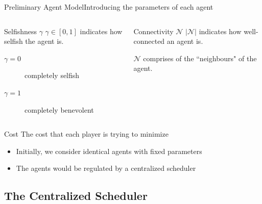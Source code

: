 \documentclass[aspectratio=169]{beamer}
\begin{document}
\begin{frame}{Preliminary Agent Model}{Introducing the parameters of each agent}

        \begin{columns}
        
        \begin{block}{Selfishness $\gamma$}
            \small $\gamma \in [0,1]$ indicates how selfish the agent is.
            \begin{description}
                \item[$\gamma=0$] completely selfish
                \item[$\gamma=1$] completely benevolent
            \end{description}
        \end{block}
        
        \begin{block}{Connectivity $\mathcal{N}$}
            \small
            $|\mathcal{N}|$ indicates how well-connected an agent is.
            
            $\mathcal{N}$ comprises of the ``neighbours" of the agent.
        \end{block}
    \end{columns}

    \pause
    
    \begin{block}{Cost}
        \small{The cost that each player is trying to minimize}
        \begin{center}
        \end{center}
    \end{block}
    \begin{itemize}
        \item Initially, we consider identical agents with fixed parameters
        \item The agents would be regulated by a centralized scheduler
    \end{itemize}    
\end{frame}

\subsection{The Centralized Scheduler}
\end{document}
